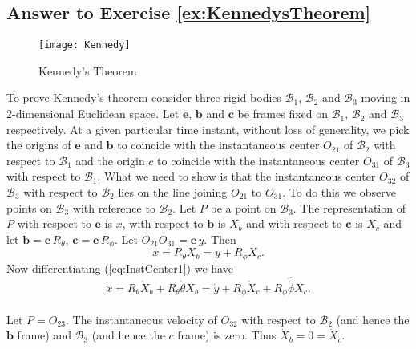 \documentclass[graybox,envcountchap,sectrefs]{svmonoMuga}
\begin{document}


\subsection*{Answer to Exercise \ref{ex:KennedysTheorem}}
\begin{figure}[ht]
\begin{center}
\texttt{[image: Kennedy]}
\renewcommand{\baselinestretch}{1}\selectfont
\caption{Kennedy's Theorem}
\label{Fig:KennedysTheorem}
\renewcommand{\baselinestretch}{1.5}\selectfont
\end{center}
\end{figure}

To prove Kennedy's theorem consider three rigid bodies $\mathcal{B}_1$, $\mathcal{B}_2$ and $\mathcal{B}_3$ moving in 2-dimensional Euclidean space. Let $\mathbf{e}$, $\mathbf{b}$ and $\mathbf{c}$ be 
frames fixed on $\mathcal{B}_1$, $\mathcal{B}_2$ and $\mathcal{B}_3$ respectively. At a given particular time instant, without loss of generality, we pick the origins of $\mathbf{e}$ and $\mathbf{b}$ 
to coincide with the instantaneous center $O_{21}$ of $\mathcal{B}_2$ with respect to $\mathcal{B}_1$ and the origin $c$ to coincide with the instantaneous center $O_{31}$ of $
\mathcal{B}_3$ with respect to $\mathcal{B}_1$. What we need to show is that the instantaneous center $O_{32}$ of $\mathcal{B}_3$ with respect to $\mathcal{B}_2$ lies on the line 
joining $O_{21}$ to $O_{31}$. To do this we observe points on $\mathcal{B}_3$ with reference to $\mathcal{B}_2$. Let $P$ be a point on $\mathcal{B}_3$. The representation of $P$ 
with respect to $\mathbf{e}$ is $x$, with respect to $\mathbf{b}$ is $X_b$ and with respect to $\mathbf{c}$ is $X_c$ and let $\mathbf{b}=\mathbf{e}\,R_{\theta}$, $\mathbf{c}=\mathbf{e}\,R_{\phi}$. Let $O_{21}O_{31}=\mathbf{e}\,y$. Then
\begin{equation}\label{eq:InstCenter1}
x=R_{\theta}X_b=y+R_{\phi}X_c.
\end{equation}
Now differentiating (\ref{eq:InstCenter1}) we have
\begin{equation}\label{eq:InstCenter2}
\dot{x} =R_{\theta}\dot{X}_b+R_{\theta}\widehat{\dot{\theta}}X_b=\dot{y}+R_{\phi}\dot{X}_c+R_{\phi}\widehat{\dot{\phi}}X_c.
\end{equation}
\\
Let $P=O_{23}$. The instantaneous velocity of $O_{32}$ with respect to $\mathcal{B}_2$ (and hence the $\mathbf{b}$ frame) and $\mathcal{B}_3$
(and hence the $c$ frame) is zero. Thus $\dot{X}_b=0=\dot{X}_c$.
\end{document}
